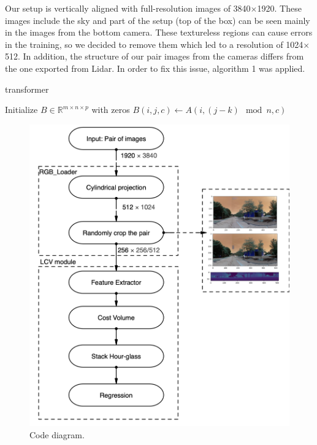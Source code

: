 \documentclass[english, LaM, oneside]{sapthesis}%
\begin{document}
Our setup is vertically aligned with full-resolution images of 3840$\times$1920. These images include the sky and part of the setup (top of the box) can be seen mainly in the images from the bottom camera. These textureless regions can cause errors in the training, so we decided to remove them which led to a resolution of 1024$\times$512. 
In addition, the structure of our pair images from the cameras differs from the one exported from Lidar. In order to fix this issue, algorithm 1 was applied. 


\begin{algorithm}
\caption{transformer}
\begin{algorithmic}[1]
    \State Initialize $B \in \mathbb{R}^{m \times n \times p}$ with zeros
                \State $B(i, j, c) \gets A(i, (j - k) \mod n, c)$
            \EndFor
        \EndFor
    \EndFor
    \State {}
\EndFunction
\end{algorithmic}
\end{algorithm}

\begin{figure}[h!] %
    \centering
    \includegraphics[width=\linewidth]{Images/diag.png}
    \caption{Code diagram.}
    \label{fig:diag}
\end{figure}
\end{document}
